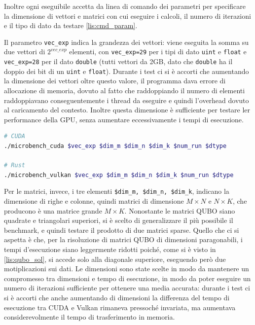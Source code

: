 Inoltre ogni eseguibile accetta da linea di comando dei parametri per specificare la dimensione di vettori e matrici con cui eseguire i calcoli, il numero di iterazioni e il tipo di dato da testare \ref{lis:cmd_param}.

Il parametro \verb|vec_exp| indica la grandezza dei vettori: viene eseguita la somma su due vettori di $2^{vec\_exp}$ elementi, con \verb|vec_exp=29| per i tipi di dato \verb|uint| e \verb|float| e \verb|vec_exp=28| per il dato \verb|double| (tutti vettori da 2GB, dato che \verb|double| ha il doppio dei bit di un \verb|uint| e \verb|float|). Durante i test ci si è accorti che aumentando la dimensione dei vettori oltre questo valore, il programma dava errore di allocazione di memoria, dovuto al fatto che raddoppiando il numero di elementi raddoppiavano conseguentemente i thread da eseguire e quindi l'overhead dovuto al caricamento del contesto. Inoltre questa dimensione è sufficiente per testare ler performance della GPU, senza aumentare eccessivamente i tempi di esecuzione.

\vspace{5mm}
\begin{lstlisting}[language=bash, caption=Esecuzione benchmark, label=lis:cmd_param]
# CUDA
./microbench_cuda $vec_exp $dim_m $dim_n $dim_k $num_run $dtype

# Rust
./microbench_vulkan $vec_exp $dim_m $dim_n $dim_k $num_run $dtype
\end{lstlisting}
\vspace{5mm}

Per le matrici, invece, i tre elementi \verb|$dim_m, $dim_n, $dim_k|, indicano la dimensione di righe e colonne, quindi matrici di dimensione $M \times N$ e $N \times K$, che producono è una matrice grande $M \times K$. Nonostante le matrici QUBO siano quadrate e triangolari superiori, si è scelto di generalizzare il più possibile il benchmark, e quindi testare il prodotto di due matrici sparse. Quello che ci si aspetta è che, per la risoluzione di matrici QUBO di dimensioni paragonabili, i tempi d'esecuzione siano leggermente ridotti poiché, come si è visto in \ref{lis:qubo_sol}, si accede solo alla diagonale superiore, eseguendo però due motiplicazioni sui dati. Le dimensioni sono state scelte in modo da mantenere un compromesso tra dimensioni e tempo di esecuzione, in modo da poter eseguire un numero di iterazioni sufficiente per ottenere una media accurata: durante i test ci si è accorti che anche aumentando di dimensioni la differenza del tempo di esecuzione tra CUDA e Vulkan rimaneva pressoché invariata, ma aumentava considerevolmente il tempo di trasferimento in memoria. 

